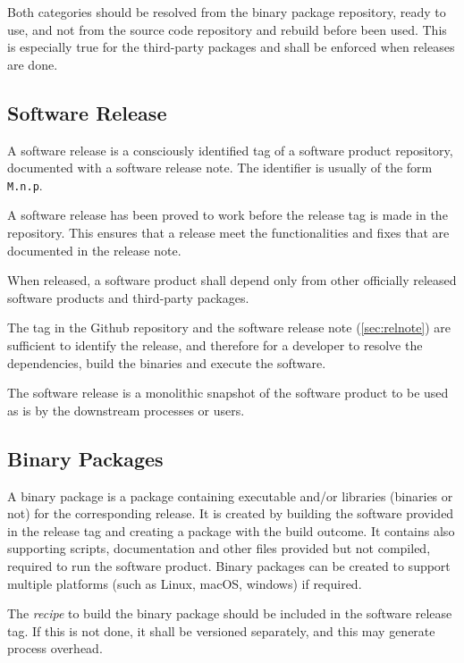 Both categories should be resolved from the binary package repository, ready to use, and not from the source code repository and rebuild before been used.
This is especially true for the third-party packages and shall be enforced when releases are done.


\subsection{Software Release} \label{sec:swrel}

A software release is a consciously identified tag of a software product repository, documented with a software release note.
The identifier is usually of the form \texttt{M.n.p}.

A software release has been proved to work before the release tag is made in the repository.
This ensures that a release meet the functionalities and fixes that are documented in the release note.

When released, a software product shall depend only from other officially released software products and third-party packages.

The tag in the Github repository and the software release note (\ref{sec:relnote}) are sufficient to identify the release, 
and therefore for a developer to resolve the dependencies, build the binaries and execute the software.

The software release is a monolithic snapshot of the software product to be used as is by the downstream processes or users.


\subsection{Binary Packages} \label{sec:swbpkg}

A binary package is a package containing executable and/or libraries (binaries or not) for the corresponding release.
It is created by building the software provided in the release tag and creating a package with the build outcome. 
It contains also supporting scripts, documentation and other files provided but not compiled, required to run the software product.
Binary packages can be created to support multiple platforms (such as Linux, macOS, windows) if required.

The \textit{recipe} to build the binary package should be included in the software release tag.
If this is not done, it shall be versioned separately, and this may generate process overhead.

